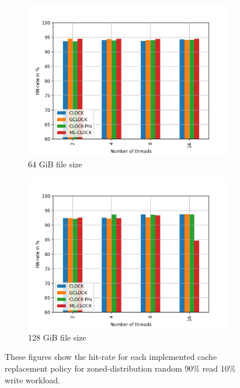 \documentclass[
	12pt,
	a4paper,
	abstract,
	bibliography=totoc,
	chapterprefix,
	headings=openright,
	numbers=endperiod,
	parskip=half,
	twoside,
]{scrreprt}
\begin{document}
\begin{figure}[H]
\begin{subfigure}{0.4\textwidth}
		\includegraphics[width=\textwidth]{multi_64_gb_rw_90to10_zoned.jpg}		
		\caption{64 GiB file size}
		\label{fig:rw_90to10  zoned}
	\end{subfigure}
	\hfill
	\begin{subfigure}{0.4\textwidth}
		\includegraphics[width=\textwidth]{multi_128_gb_rw_90to10_zoned.jpg}		
		\caption{128 GiB file size}
		\label{fig:rw_90to10  uniform}
	\end{subfigure}
	\caption{These figures show the hit-rate for each implemented cache replacement policy for zoned-distribution random 90\% read 10\% write workload.}
\end{figure}
\end{document}

